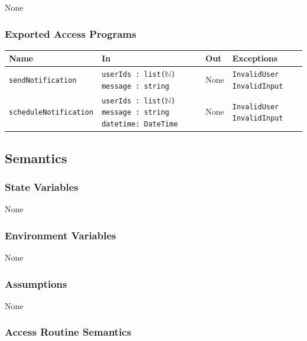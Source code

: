 \documentclass[12pt, titlepage]{article}
\begin{document}
None

\subsubsection{Exported Access Programs}

\begin{center}
\begin{tabularx}{\textwidth}{p{} p{} p{} p{}}
\hline
\textbf{Name} & \textbf{In} & \textbf{Out} & \textbf{Exceptions} \\
\hline
\texttt{sendNotification} & \texttt{userIds : list($\mathbb{N}$) \newline message : string} & None & \texttt{InvalidUser} \newline \texttt{InvalidInput} \\
\hline
\texttt{scheduleNotification} & \texttt{userIds : list($\mathbb{N}$) \newline message : string \newline datetime: DateTime} & None & \texttt{InvalidUser} \newline \texttt{InvalidInput} \\
\hline
\end{tabularx}
\end{center}

\subsection{Semantics}

\subsubsection{State Variables}

None

\subsubsection{Environment Variables}

None

\subsubsection{Assumptions}

None

\subsubsection{Access Routine Semantics}
\end{document}
